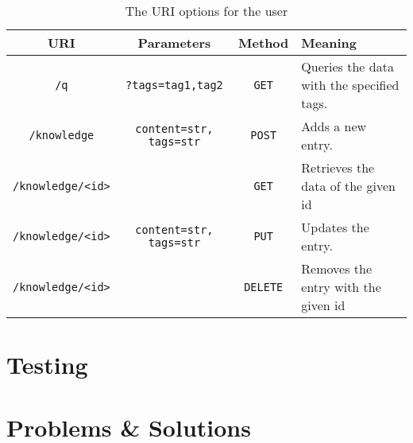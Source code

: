 \documentclass[11pt, a4paper]{article}
\begin{document}
\begin{table}[htbp]
  \centering
  \begin{tabular}{| c | c | c | l | } \hline
    \textbf{URI} & \textbf{Parameters} & \textbf{Method} & \textbf{Meaning} \\ \hline
    \lstinline|/q| & \lstinline|?tags=tag1,tag2| & \lstinline|GET| & Queries the data with the specified tags.  \\ \hline
    \lstinline|/knowledge| & \lstinline|content=str, tags=str| & \lstinline|POST| & Adds a new entry. \\ \hline
    \lstinline|/knowledge/<id>| &  & \lstinline|GET| & Retrieves the data of the given id  \\ \hline
    \lstinline|/knowledge/<id>| & \lstinline|content=str, tags=str| & \lstinline|PUT| & Updates the entry.   \\ \hline
    \lstinline|/knowledge/<id>| &  & \lstinline|DELETE| & Removes the entry with the given id \\ \hline
  \end{tabular}
  \caption{The URI options for the user}
  \label{tab:uri}
\end{table}


\subsection{}

\section{Testing}
\section{Problems \& Solutions}

\nocite{*}


\end{document}
